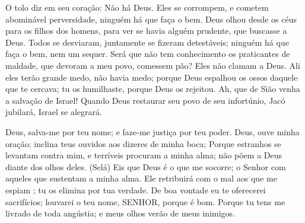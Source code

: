 
{\PP 
  O tolo diz em seu coração: Não há Deus. Eles se corrompem, e cometem abominável perversidade, ninguém há que faça o bem.
  Deus olhou desde os céus para os filhos dos homens, para ver se havia alguém prudente, que buscasse a Deus.
  Todos se desviaram, juntamente se fizeram detestáveis; ninguém há que faça o bem, nem um sequer.
  Será que não tem conhecimento os praticantes de maldade, que devoram a meu povo,
{} comessem pão? Eles não clamam a Deus.
  Ali eles terão grande medo,
{} não havia medo; porque Deus espalhou os ossos daquele que te cercava; tu os humilhaste, porque Deus os rejeitou.
  Ah, que de Sião venha a salvação de Israel! Quando Deus restaurar seu povo de seu infortúnio, Jacó jubilará, Israel se alegrará.
\par }


{\PP 
  Deus, salva-me por teu nome; e faze-me justiça por teu poder.
  Deus, ouve minha oração; inclina teus ouvidos aos dizeres de minha boca;
  Porque estranhos se levantam contra mim, e
{} terríveis procuram
{} a minha alma; não põem a Deus diante dos olhos deles. (Selá)
  Eis que Deus é o que me socorre; o Senhor
{} com aqueles que sustentam a minha alma.
  Ele retribuirá com o mal aos que me espiam
{} ; tu os elimina por tua verdade.
  De boa vontade eu te oferecerei sacrifícios; louvarei o teu nome, SENHOR, porque é bom.
  Porque tu tens me livrado de toda angústia; e meus olhos verão
{} de meus inimigos.
\par }


